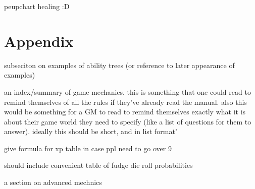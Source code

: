 \documentclass[12pt]{article}
\newcommand{\notes}[1]{{\color{Tan} #1}}
\begin{document}
\notes{peupchart healing :D}


\section{Appendix}


\notes{subseciton on examples of ability trees (or reference to later appearance of examples)}

\notes{an index/summary of game mechanics. this is something that one could read to remind themselves of all the rules
if they've already read the manual. also this would be something for a GM to read to remind themselves
exactly what it is about their game world they need to specify (like a list of questions for them to answer).
ideally this should be short, and in list format"}


\notes{give formula for xp table in case ppl need to go over 9}

\notes{should include convenient table of fudge die roll probabilities}

\notes{a section on advanced mechnics}

\printindex
\end{document}
